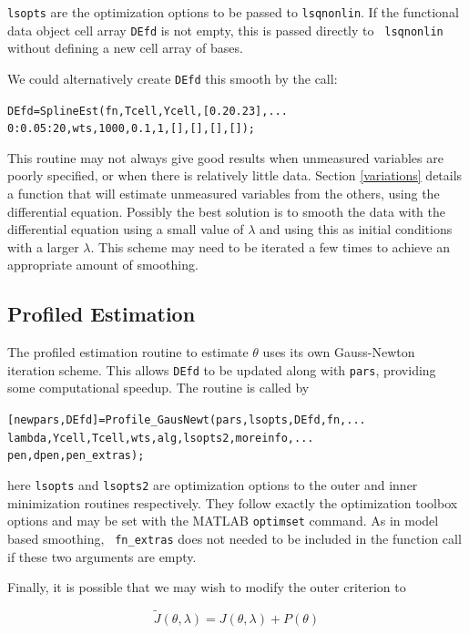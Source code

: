 \documentclass{article}
\newcommand{\nt}    {\noindent}
\begin{document}
{\tt lsopts} are the optimization options to be
passed to {\tt lsqnonlin}. If the functional data object cell
array {\tt DEfd} is not empty, this is passed directly to {\tt
  lsqnonlin} without defining a new cell array of bases.

We could alternatively create {\tt DEfd} this smooth by the
call:

\begin{alltt}
   DEfd = SplineEst(fn,Tcell,Ycell,[0.2 0.2 3],...
        0:0.05:20,wts,1000,0.1,1,[],[],[],[]);
\end{alltt}

This routine may not always give good results when unmeasured variables are poorly specified, or
when there is relatively little data. Section \ref{variations} details a function that will
estimate unmeasured variables from the others, using the differential equation.  Possibly the best
solution is to smooth the data with the differential equation using a small value of $\lambda$ and
using this as initial conditions with a larger $\lambda$. This scheme may need to be iterated a few
times to achieve an appropriate amount of smoothing.



\subsection{Profiled Estimation}

The profiled estimation routine to estimate $\theta$ uses its own
Gauss-Newton iteration scheme. This allows {\tt DEfd} to be updated
along with {\tt pars}, providing some computational speedup. The
routine is called by

\begin{alltt}
   [newpars,DEfd] = Profile_GausNewt(pars,lsopts,DEfd,fn,...
            lambda,Ycell,Tcell,wts,alg,lsopts2,moreinfo,...
            pen,dpen,pen_extras);
\end{alltt}

\nt here {\tt lsopts} and {\tt lsopts2} are optimization options to
the outer and inner minimization routines respectively. They follow
exactly the optimization toolbox options and may be set with the
MATLAB {\tt optimset} command. As in model based smoothing, {\tt
  fn\_extras} does not needed to be included in the function call
  if these two arguments are empty.

Finally, it is possible that we may wish to modify the
outer criterion to

\[ \tilde{J}(\theta,\lambda) = J(\theta,\lambda) +
P(\theta) \]
\end{document}
